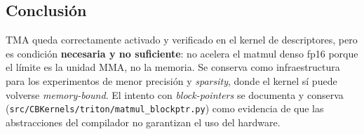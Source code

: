 \subsection{Conclusión}

TMA queda correctamente activado y verificado en el kernel de descriptores, pero es
condición \textbf{necesaria y no suficiente}: no acelera el matmul denso fp16 porque
el límite es la unidad MMA, no la memoria. Se conserva como infraestructura para los
experimentos de menor precisión y \emph{sparsity}, donde el kernel sí puede volverse
\emph{memory-bound}. El intento con \emph{block-pointers} se documenta y conserva
(\texttt{src/CBKernels/triton/matmul\_blockptr.py}) como evidencia de que las
abstracciones del compilador no garantizan el uso del hardware.
